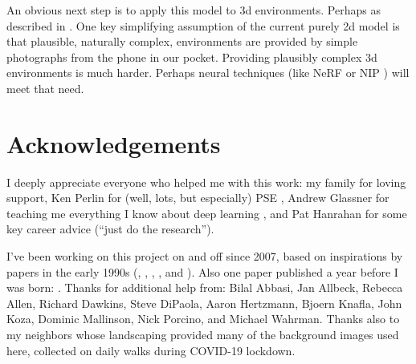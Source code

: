 \documentclass[letterpaper]{article}
\begin{document}
\par
An obvious next step is to apply this model to 3d environments. Perhaps as described in \citet{miller_color_2022}. One key simplifying assumption of the current purely 2d model is that plausible, naturally complex, environments are provided by simple photographs from the phone in our pocket. Providing plausibly complex 3d environments is much harder. Perhaps neural techniques (like NeRF \cite{gao_nerf_2022} or NIP \cite{sharp_spelunking_2022}) will meet that need.
\par



\section{Acknowledgements}
I deeply appreciate everyone who helped me with this work: my family for loving support, Ken Perlin for (well, lots, but especially) PSE \cite{perlin_image_1985}, Andrew Glassner for teaching me everything I know about deep learning \cite{glassner_deep_2021}, and Pat Hanrahan for some key career advice (“just do the research”).
\par
I've been working on this project on and off since 2007, based on inspirations by papers in the early 1990s (\citet{witkin_reaction_1991}, \citet{turk_generating_1991}, \citet{angeline_competitive_1993}, \citet{sims_artificial_1991}, and \citet{sims_evolving_1994}). Also one paper published a year before I was born: \citet{turing_chemical_1952}.
Thanks for additional help from:
Bilal Abbasi,
Jan Allbeck,
Rebecca Allen,
Richard Dawkins,
Steve DiPaola,
Aaron Hertzmann,
Bjoern Knafla,
John Koza,
Dominic Mallinson,
Nick Porcino,
and Michael Wahrman.
Thanks also to my neighbors whose landscaping provided many of the background images used here, collected on daily walks during COVID-19 lockdown.
\par





\end{document}
